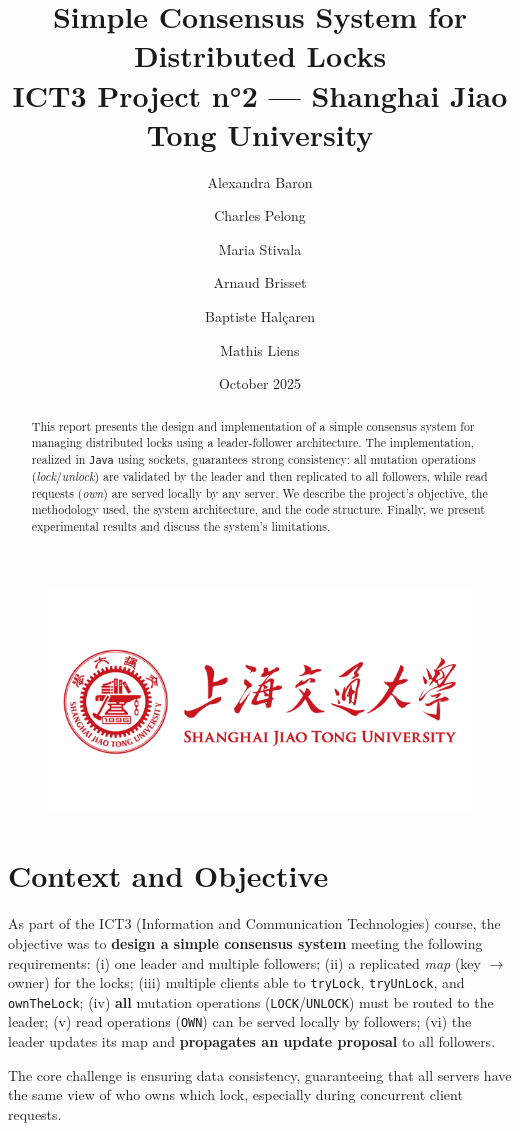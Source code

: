 \documentclass[a4paper,11pt]{article}
\title{Simple Consensus System for Distributed Locks\\
\large ICT3 Project n°2 — Shanghai Jiao Tong University}
\author{Alexandra Baron \and Charles Pelong \and Maria Stivala \and Arnaud Brisset \and Baptiste Halçaren \and Mathis Liens}
\date{October 2025}
\begin{document}
\maketitle

\begin{figure}[htbp]
\centering
\includegraphics[width=0.6\linewidth]{shanghai-jiao-tong-university.png}
\end{figure}

\begin{abstract}
This report presents the design and implementation of a simple consensus system for managing distributed locks using a leader-follower architecture. The implementation, realized in \texttt{Java} using sockets, guarantees strong consistency: all mutation operations (\emph{lock}/\emph{unlock}) are validated by the leader and then replicated to all followers, while read requests (\emph{own}) are served locally by any server. We describe the project's objective, the methodology used, the system architecture, and the code structure. Finally, we present experimental results and discuss the system's limitations.
\end{abstract}

\section{Context and Objective}
As part of the ICT3 (Information and Communication Technologies) course, the objective was to \textbf{design a simple consensus system} meeting the following requirements: (i) one leader and multiple followers; (ii) a replicated \textit{map} (key $\rightarrow$ owner) for the locks; (iii) multiple clients able to \texttt{tryLock}, \texttt{tryUnLock}, and \texttt{ownTheLock}; (iv) \textbf{all} mutation operations (\texttt{LOCK}/\texttt{UNLOCK}) must be routed to the leader; (v) read operations (\texttt{OWN}) can be served locally by followers; (vi) the leader updates its map and \textbf{propagates an update proposal} to all followers.

The core challenge is ensuring data consistency, guaranteeing that all servers have the same view of who owns which lock, especially during concurrent client requests.
\end{document}
